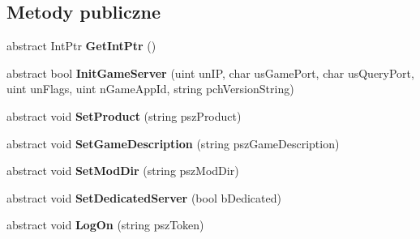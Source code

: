 \subsection*{Metody publiczne}
\begin{DoxyCompactItemize}
\item 
\mbox{\label{class_valve_1_1_steamworks_1_1_i_steam_game_server_abc62d020895632dfb059c2caf0a55919}} 
abstract Int\+Ptr {\bfseries Get\+Int\+Ptr} ()
\item 
\mbox{\label{class_valve_1_1_steamworks_1_1_i_steam_game_server_a630deec11f56f6973855740e4dddae16}} 
abstract bool {\bfseries Init\+Game\+Server} (uint un\+IP, char us\+Game\+Port, char us\+Query\+Port, uint un\+Flags, uint n\+Game\+App\+Id, string pch\+Version\+String)
\item 
\mbox{\label{class_valve_1_1_steamworks_1_1_i_steam_game_server_a384f6155b77a02d73cc34cfe9774bfa3}} 
abstract void {\bfseries Set\+Product} (string psz\+Product)
\item 
\mbox{\label{class_valve_1_1_steamworks_1_1_i_steam_game_server_a5275d0e93c58089aa64c2a133c11effc}} 
abstract void {\bfseries Set\+Game\+Description} (string psz\+Game\+Description)
\item 
\mbox{\label{class_valve_1_1_steamworks_1_1_i_steam_game_server_ac2835a52d9809337ffe088ce04fe55cc}} 
abstract void {\bfseries Set\+Mod\+Dir} (string psz\+Mod\+Dir)
\item 
\mbox{\label{class_valve_1_1_steamworks_1_1_i_steam_game_server_a208d08bb2a65cb8430377b243aacdf0e}} 
abstract void {\bfseries Set\+Dedicated\+Server} (bool b\+Dedicated)
\item 
\mbox{\label{class_valve_1_1_steamworks_1_1_i_steam_game_server_ae083a917e9f6883601850cdb534cad6a}} 
abstract void {\bfseries Log\+On} (string psz\+Token)
\item 
\mbox{\label{class_valve_1_1_steamworks_1_1_i_steam_game_server_ad4a4bca12fdf1c4def5af89a20ed46ed}} 

\end{DoxyCompactItemize}
